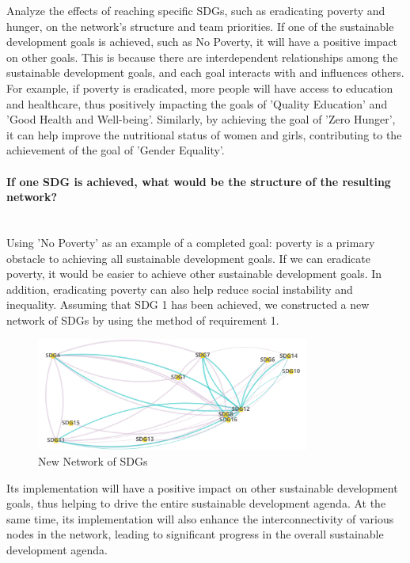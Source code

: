 \documentclass[10pt]{mcmthesis}
\newcommand{\subsubsubsection}[1]{\paragraph{#1}\mbox{}\\}
\begin{document}
Analyze the effects of reaching specific SDGs, such as eradicating poverty and hunger, on the network's structure and team priorities.
If one of the sustainable development goals is achieved, such as No Poverty, it will have a positive impact on other goals. This is because there are interdependent relationships among the sustainable development goals, and each goal interacts with and influences others. For example, if poverty is eradicated, more people will have access to education and healthcare, thus positively impacting the goals of 'Quality Education' and 'Good Health and Well-being'. Similarly, by achieving the goal of 'Zero Hunger', it can help improve the nutritional status of women and girls, contributing to the achievement of the goal of 'Gender Equality'.

\subsubsubsection{If one SDG is achieved, what would be the structure of the resulting network?}

Using 'No Poverty' as an example of a completed goal: poverty is a primary obstacle to achieving all sustainable development goals. If we can eradicate poverty, it would be easier to achieve other sustainable development goals. In addition, eradicating poverty can also help reduce social instability and inequality.
Assuming that SDG 1 has been achieved, we constructed a new network of SDGs by using the method of requirement 1.

\begin{figure}[h]
    \centering
    \includegraphics[width=9cm]{figures/Go to nodes.jpg}
    \caption{New Network of SDGs}%
    \label{fig.new network}
    \vspace{-15pt}
    \small
\end{figure} 

Its implementation will have a positive impact on other sustainable development goals, thus helping to drive the entire sustainable development agenda. At the same time, its implementation will also enhance the interconnectivity of various nodes in the network, leading to significant progress in the overall sustainable development agenda.
\end{document}
